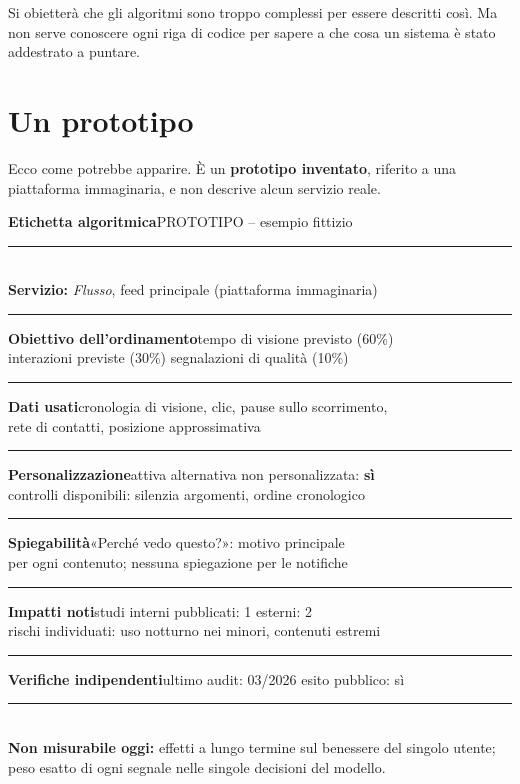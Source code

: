 Si obietterà che gli algoritmi sono troppo complessi per essere descritti così. Ma non serve conoscere ogni riga di codice per sapere a che cosa un sistema è stato addestrato a puntare.

\section{Un prototipo}
\label{sec:p4c31-prototipo}

Ecco come potrebbe apparire. È un \textbf{prototipo inventato}, riferito a una piattaforma immaginaria, e non descrive alcun servizio reale.

\begin{center}
\begin{tcolorbox}[enhanced, width=0.86\textwidth, colback=white, colframe=modernblack, boxrule=1.2pt, arc=0mm, left=6pt, right=6pt, top=4pt, bottom=4pt, fontupper=\sffamily\small]
{\large\bfseries Etichetta algoritmica}\hfill{\footnotesize PROTOTIPO -- esempio fittizio}\\[-2pt]
\rule{\linewidth}{2.5pt}\\
\textbf{Servizio:} \textit{Flusso}, feed principale (piattaforma immaginaria)\\[-4pt]
\rule{\linewidth}{0.4pt}
\textbf{Obiettivo dell'ordinamento}\hfill tempo di visione previsto (60\%)\\
\hspace*{1em}interazioni previste (30\%) \textperiodcentered{} segnalazioni di qualità (10\%)\\[-4pt]
\rule{\linewidth}{0.4pt}
\textbf{Dati usati}\hfill cronologia di visione, clic, pause sullo scorrimento,\\
\hspace*{1em}rete di contatti, posizione approssimativa\\[-4pt]
\rule{\linewidth}{0.4pt}
\textbf{Personalizzazione}\hfill attiva \textperiodcentered{} alternativa non personalizzata: \textbf{sì}\\
\hspace*{1em}controlli disponibili: silenzia argomenti, ordine cronologico\\[-4pt]
\rule{\linewidth}{0.4pt}
\textbf{Spiegabilità}\hfill «Perché vedo questo?»: motivo principale\\
\hspace*{1em}per ogni contenuto; nessuna spiegazione per le notifiche\\[-4pt]
\rule{\linewidth}{0.4pt}
\textbf{Impatti noti}\hfill studi interni pubblicati: 1 \textperiodcentered{} esterni: 2\\
\hspace*{1em}rischi individuati: uso notturno nei minori, contenuti estremi\\[-4pt]
\rule{1\linewidth}{0.4pt}
\textbf{Verifiche indipendenti}\hfill ultimo audit: 03/2026 \textperiodcentered{} esito pubblico: sì\\[-2pt]
\rule{\linewidth}{2.5pt}\\
{\footnotesize\textbf{Non misurabile oggi:} effetti a lungo termine sul benessere del singolo utente; peso esatto di ogni segnale nelle singole decisioni del modello.}
\end{tcolorbox}
\end{center}

